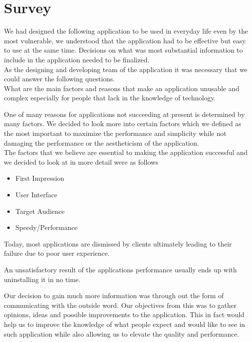 \documentclass[a4paper,12pt]{report}
\begin{document}
\section{Survey}
\vspace{5mm} %

We had designed the following application to be used in everyday life even by the most vulnerable, we understood that the application had to be effective but easy to use at the same time. Decisions on what was most substantial information to include in the application needed to be finalized.\\

As the designing and developing team of the application it was necessary that we could answer the following questions. \\

What are the main factors and reasons that make an application unusable and complex especially for people that lack in the knowledge of technology.

One of many reasons for applications not succeeding at present is determined by many factors. We decided to look more into certain factors which we defined as the most important to maximize the performance and simplicity while not damaging the performance or the aestheticism of the application. 
\cite{DesignFailure}\\

The factors that we believe are essential to making the application successful and we decided to look at in more detail were as follows

\begin{itemize}
    \item First Impression
    \item User Interface
    \item Target Audience
    \item Speedy/Performance
\end{itemize}

Today, most applications are dismissed by clients ultimately leading to their failure due to poor user experience.

An unsatisfactory result of the applications performance usually ends up with uninstalling it in no time. 
\cite{AppFailure}

Our decision to gain much more information was through out the form of communicating with the outside word. Our objectives from this was to gather opinions, ideas and possible improvements to the application.
This in fact would help us to improve the knowledge of what people expect and would like to see in such application while also allowing us to elevate the quality and performance.\cite{surveyReasearch}
\end{document}
